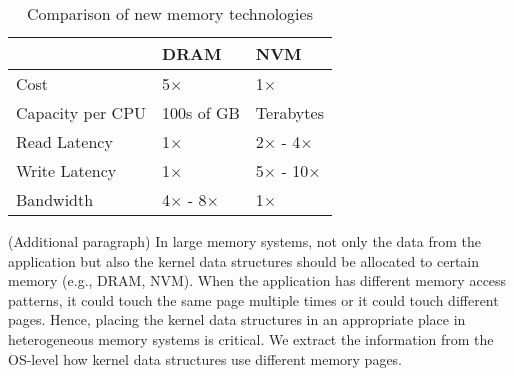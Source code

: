 \documentclass{sig-alternate}
\begin{document}
\begin{table}[t]
\centering
\begin{tabular}{|l|l|l|}
\hline
                 & DRAM       & NVM        \\ \hline
Cost             & 5$\times$        & 1$\times$        \\ \hline
Capacity per CPU & 100s of GB & Terabytes  \\ \hline
Read Latency     & 1$\times$        & 2$\times$ - 4$\times$  \\ \hline
Write Latency    & 1$\times$        & 5$\times$ - 10$\times$ \\ \hline
Bandwidth        & 4$\times$ - 8$\times$  & 1$\times$        \\ \hline
\end{tabular}
\caption{Comparison of new memory technologies \cite{venkataraman2011consistent, dulloor2016data, kannan2017heteroos}}
\end{table}

(Additional paragraph) In large memory systems, not only the data from the application but also the kernel data structures should be allocated to certain memory (e.g., DRAM, NVM). When the application has different memory access patterns, it could touch the same page multiple times or it could touch different pages. Hence, placing the kernel data structures in an appropriate place in heterogeneous memory systems is critical. We extract the information from the OS-level how kernel data structures use different memory pages. 




\end{document}

